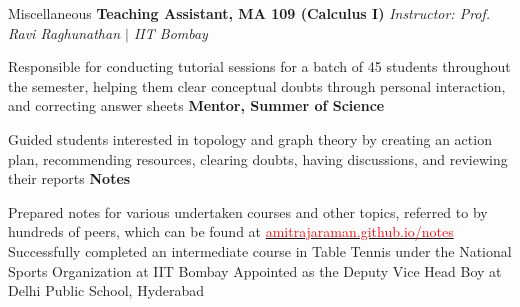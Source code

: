
\begin{rubric}{Miscellaneous}
    \entry*[2020] \textbf{Teaching Assistant, MA 109 (Calculus I)} \hfill \emph{Instructor: Prof. Ravi Raghunathan $\mid$ IIT Bombay}
	    
	    Responsible for conducting tutorial sessions for a batch of 45 students throughout the semester, helping them clear conceptual doubts through personal interaction, and correcting answer sheets
	\entry*[2021--2022] \textbf{Mentor, Summer of Science}

		Guided students interested in topology and graph theory by creating an action plan, recommending resources, clearing doubts, having discussions, and reviewing their reports
	\entry*[2020--Present] \textbf{Notes}

		Prepared notes for various undertaken courses and other topics, referred to by hundreds of peers, which can be found at \href{https://amitrajaraman.github.io/notes}{\textcolor{red}{amitrajaraman.github.io/notes}}
	\entry*[2019] Successfully completed an intermediate course in Table Tennis under the National Sports Organization at IIT Bombay	
	\entry*[2016] Appointed as the Deputy Vice Head Boy at Delhi Public School, Hyderabad


\end{rubric}